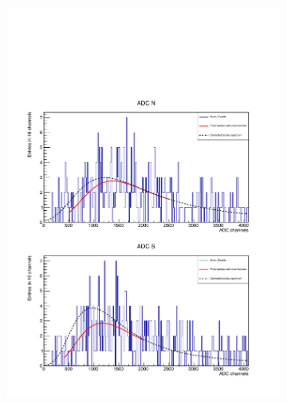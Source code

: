 \begin{figure}[h!]
  \begin{subfigure}{0.5\linewidth}
    \includegraphics[width=\linewidth{}]{./fig/70M6CorrectedLandau.pdf}
    \caption{}
    \label{fig:landau_earlyM6}
  \end{subfigure}
  \begin{subfigure}{0.5\linewidth}

\end{subfigure}
\end{figure}
